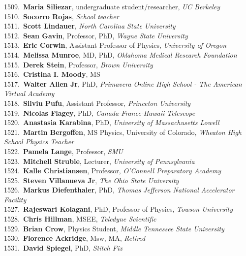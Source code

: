1509.~{\bf Maria Siliezar}, undergraduate student/researcher, {\sl UC Berkeley} \\
1510.~{\bf Socorro Rojas}, {\sl School teacher} \\
1511.~{\bf Scott Lindauer}, {\sl North Carolina State University } \\
1512.~{\bf Sean Gavin}, Professor, PhD, {\sl Wayne State University} \\
1513.~{\bf Eric Corwin}, Assistant Professor of Physics, {\sl University of Oregon} \\
1514.~{\bf Melissa Munroe}, MD, PhD, {\sl Oklahoma Medical Research Foundation } \\
1515.~{\bf Derek Stein}, Professor, {\sl Brown University} \\
1516.~{\bf Cristina I. Moody}, MS \\
1517.~{\bf Walter Allen Jr}, PhD, {\sl Primavera Online High School - The American Virtual Academy} \\
1518.~{\bf Silviu Pufu}, Assistant Professor, {\sl Princeton University} \\
1519.~{\bf Nicolas Flagey}, PhD, {\sl Canada-France-Hawaii Telescope} \\
1520.~{\bf Anastasia Karabina}, PhD, {\sl University of Massachusetts Lowell} \\
1521.~{\bf Martin Bergoffen}, MS Physics, University of Colorado, {\sl Wheaton High School Physics Teacher} \\
1522.~{\bf Pamela Lange}, Professor, {\sl SMU} \\
1523.~{\bf Mitchell Struble}, Lecturer, {\sl University of Pennsylvania} \\
1524.~{\bf Kalle Christiansen}, Professor, {\sl O'Connell Preparatory Academy} \\
1525.~{\bf Steven Villanueva Jr}, {\sl The Ohio State University } \\
1526.~{\bf Markus Diefenthaler}, PhD, {\sl Thomas Jefferson National Accelerator Facility} \\
1527.~{\bf Rajeswari Kolagani}, PhD, Professor of Physics, {\sl Towson University} \\
1528.~{\bf Chris Hillman}, MSEE, {\sl Teledyne Scientific} \\
1529.~{\bf Brian Crow}, Physics Student, {\sl Middle Tennessee State University} \\
1530.~{\bf Florence Ackridge}, Msw, MA, {\sl Retired } \\
1531.~{\bf David Spiegel}, PhD, {\sl Stitch Fix} \\
